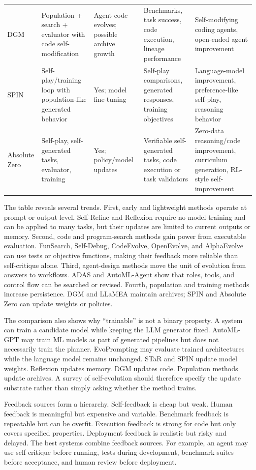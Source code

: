 {\begin{longtable}{@{}L{0.15\textwidth}L{0.20\textwidth}L{0.14\textwidth}L{0.23\textwidth}L{0.19\textwidth}@{}}
DGM & Population + search + evaluator with code self-modification & Agent code evolves; possible archive growth & Benchmarks, task success, code execution, lineage performance & Self-modifying coding agents, open-ended agent improvement \\
SPIN & Self-play/training loop with population-like generated behavior & Yes; model fine-tuning & Self-play comparisons, generated responses, training objectives & Language-model improvement, preference-like self-play, reasoning behavior \\
Absolute Zero & Self-play, self-generated tasks, evaluator, training & Yes; policy/model updates & Verifiable self-generated tasks, code execution or task validators & Zero-data reasoning/code improvement, curriculum generation, RL-style self-improvement \\
\end{longtable}}

The table reveals several trends.  First, early and lightweight methods operate at prompt or output level.  Self-Refine and Reflexion require no model training and can be applied to many tasks, but their updates are limited to current outputs or memory.  Second, code and program-search methods gain power from executable evaluation.  FunSearch, Self-Debug, CodeEvolve, OpenEvolve, and AlphaEvolve can use tests or objective functions, making their feedback more reliable than self-critique alone.  Third, agent-design methods move the unit of evolution from answers to workflows.  ADAS and AutoML-Agent show that roles, tools, and control flow can be searched or revised.  Fourth, population and training methods increase persistence.  DGM and LLaMEA maintain archives; SPIN and Absolute Zero can update weights or policies.

The comparison also shows why ``trainable'' is not a binary property.  A system can train a candidate model while keeping the LLM generator fixed.  AutoML-GPT may train ML models as part of generated pipelines but does not necessarily train the planner.  EvoPrompting may evaluate trained architectures while the language model remains unchanged.  STaR and SPIN update model weights.  Reflexion updates memory.  DGM updates code.  Population methods update archives.  A survey of self-evolution should therefore specify the update substrate rather than simply asking whether the method trains.

Feedback sources form a hierarchy.  Self-feedback is cheap but weak.  Human feedback is meaningful but expensive and variable.  Benchmark feedback is repeatable but can be overfit.  Execution feedback is strong for code but only covers specified properties.  Deployment feedback is realistic but risky and delayed.  The best systems combine feedback sources.  For example, an agent may use self-critique before running, tests during development, benchmark suites before acceptance, and human review before deployment.

